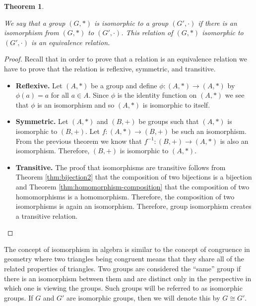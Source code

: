 \documentclass[
]{book}
\newtheorem{theorem}{Theorem}[chapter]
\theoremstyle{definition}
\theoremstyle{definition}
\theoremstyle{definition}
\theoremstyle{definition}
\theoremstyle{remark}
\begin{document}
\begin{theorem}
\protect\hypertarget{thm:group-isomorphism-equivalence}{}\label{thm:group-isomorphism-equivalence}

We say that a group \((G,*)\) is isomorphic to a group \((G',\cdot)\) if there is an isomorphism from \((G,*)\) to \((G',\cdot)\). This relation of \((G,*)\) isomorphic to \((G',\cdot)\) is an equivalence relation.

\end{theorem}

\begin{proof}

Recall that in order to prove that a relation is an equivalence relation we have to prove that the relation is reflexive, symmetric, and transitive.

\begin{itemize}
\item
  \textbf{Reflexive.} Let \((A,*)\) be a group and define \(\phi:(A,*)\rightarrow (A,*)\) by \(\phi(a)=a\) for all \(a\in A\). Since \(\phi\) is the identity function on \((A,*)\) we see that \(\phi\) is an isomorphism and so \((A,*)\) is isomorphic to itself.
\item
  \textbf{Symmetric.} Let \((A,*)\) and \((B,+)\) be groups such that \((A,*)\) is isomorphic to \((B,+)\). Let \(f:(A,*)\rightarrow (B,+)\) be such an isomorphism. From the previous theorem we know that \(f^{-1}: (B,+) \rightarrow (A,*)\) is also an isomorphism. Therefore, \((B,+)\) is isomorphic to \((A,*)\).
\item
  \textbf{Transitive.} The proof that isomorphisms are transitive follows from Theorem \ref{thm:bijection2} that the composition of two bijections is a bijection and Theorem \ref{thm:homomorphism-composition} that the composition of two homomorphisms is a homomorphism. Therefore, the composition of two isomorphisms is again an isomorphism. Therefore, group isomorphism creates a transitive relation.
\end{itemize}

\end{proof}

The concept of isomorphism in algebra is similar to the concept of congruence in geometry where two triangles being congruent means that they share all of the related properties of triangles. Two groups are considered the ``same'' group if there is an isomorphism between them and are distinct only in the perspective in which one is viewing the groups. Such groups will be referred to as isomorphic groups. If \(G\) and \(G'\) are isomorphic groups, then we will denote this by \(G \cong G'\).
\end{document}
